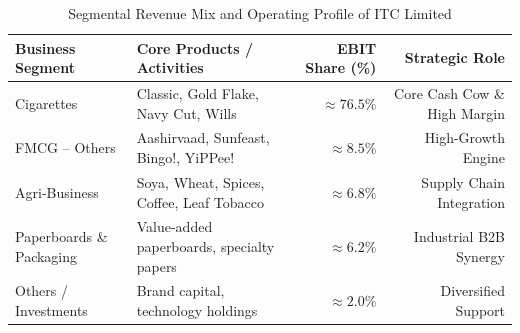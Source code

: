 \begin{table}[htbp]
\centering
\small
\caption{Segmental Revenue Mix and Operating Profile of ITC Limited}
\label{tab:itc_segments}
\begin{tabularx}{\linewidth}{lXrr}
\toprule
\textbf{Business Segment} & \textbf{Core Products / Activities} & \textbf{EBIT Share (\%)} & \textbf{Strategic Role} \\
\midrule
Cigarettes & Classic, Gold Flake, Navy Cut, Wills & $\approx 76.5\%$ & Core Cash Cow \& High Margin \\
FMCG -- Others & Aashirvaad, Sunfeast, Bingo!, YiPPee! & $\approx 8.5\%$ & High-Growth Engine \\
Agri-Business & Soya, Wheat, Spices, Coffee, Leaf Tobacco & $\approx 6.8\%$ & Supply Chain Integration \\
Paperboards \& Packaging & Value-added paperboards, specialty papers & $\approx 6.2\%$ & Industrial B2B Synergy \\
Others / Investments & Brand capital, technology holdings & $\approx 2.0\%$ & Diversified Support \\
\bottomrule
\end{tabularx}
\end{table}


